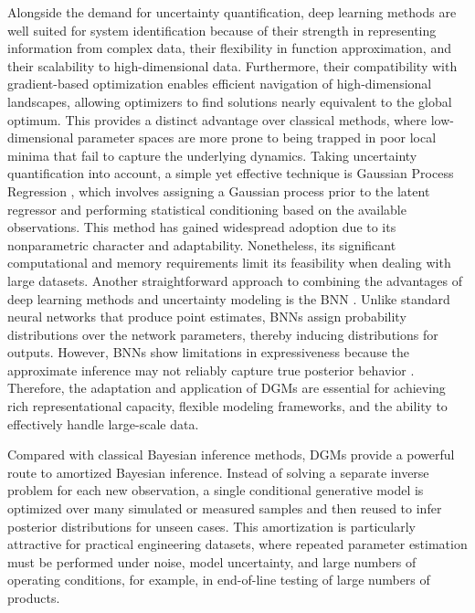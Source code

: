 Alongside the demand for uncertainty quantification, deep learning methods are well suited for system identification because of their strength in representing information from complex data, their flexibility in function approximation, and their scalability to high-dimensional data. Furthermore, their compatibility with gradient-based optimization enables efficient navigation of high-dimensional landscapes, allowing optimizers to find solutions nearly equivalent to the global optimum. This provides a distinct advantage over classical methods, where low-dimensional parameter spaces are more prone to being trapped in poor local minima that fail to capture the underlying dynamics. Taking uncertainty quantification into account, a simple yet effective technique is Gaussian Process Regression \citep{sarkka2019gp}, which involves assigning a Gaussian process prior to the latent regressor and performing statistical conditioning based on the available observations. This method has gained widespread adoption due to its nonparametric character and adaptability. Nonetheless, its significant computational and memory requirements limit its feasibility when dealing with large datasets. Another straightforward approach to combining the advantages of deep learning methods and uncertainty modeling is the \acf{BNN} \citep{Goan_2020}. Unlike standard neural networks that produce point estimates, \acp{BNN} assign probability distributions over the network parameters, thereby inducing distributions for outputs. However, \acp{BNN} show limitations in expressiveness because the approximate inference may not reliably capture true posterior behavior \citep{foong2020bnn}. Therefore, the adaptation and application of \acp{DGM} are essential for achieving rich representational capacity, flexible modeling frameworks, and the ability to effectively handle large-scale data.

Compared with classical Bayesian inference methods, \acp{DGM} provide a powerful route to amortized Bayesian inference. Instead of solving a separate inverse problem for each new observation, a single conditional generative model is optimized over many simulated or measured samples and then reused to infer posterior distributions for unseen cases. This amortization is particularly attractive for practical engineering datasets, where repeated parameter estimation must be performed under noise, model uncertainty, and large numbers of operating conditions, for example, in end-of-line testing of large numbers of products. 

